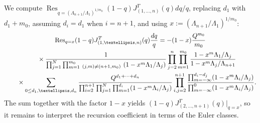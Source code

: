 \documentclass[11pt]{article}
\numberwithin{equation}{section}
\numberwithin{equation}{section}
\def\Res{\operatorname{Res}}
\begin{document}
We compute $\Res_{q=(\Lambda_{n+1}/\Lambda_1)^{1/m_0}} (1-q)J^T_{(1,\dots,n)}(q)dq/q$, replacing $d_1$ with $d_1+m_0$, assuming $d_i=d_1$ when $i=n+1$, and using $x:= (\Lambda_{n+1}/\Lambda_1)^{1/m_0}$:
\begin{gather*}
\Res_{q=x} (1-q)J^T_{(1,\dots,n)}(q)\frac{{\rm d}q}{q} = -(1-x)\frac{Q^{m_0}}{m_0}
\\ \qquad
{}\times\frac{1}{\prod_{j=1}^N\prod_{m=1}^{m_0}\,_{(j,m)\neq (n+1,m_0)}\ (1-x^m\Lambda_1/\Lambda_j)} \prod_{j=2}^n\prod_{m=1}^{m_0}\frac{1-x^m\Lambda_1/\Lambda_j}{1-x^m\Lambda_j/\Lambda_{n+1}}
\\ \qquad
{}\times\sum_{0\leq d_1,\dots,d_n}\frac{Q^{d_1+\cdots+d_n}}{\prod_{i=2}^{n+1}\prod_{j=1}^N\prod_{m=1}^{d_i}
(1-x^m\Lambda_i/\Lambda_j)} \prod_{i,j=2}^{n+1}\frac{\prod_{m=-\infty}^{d_i-d_j}
(1-x^m\Lambda_i/\Lambda_j)}{\prod_{m=-\infty}^0(1-x^m\Lambda_i/\Lambda_j)}.
\end{gather*}
The sum together with the factor $1-x$ yields $(1-q)J^T_{(2,\dots,n+1)}(q)|_{q=x}$, so it remains to interpret the recursion coefficient in terms of the Euler classes.
\end{document}
